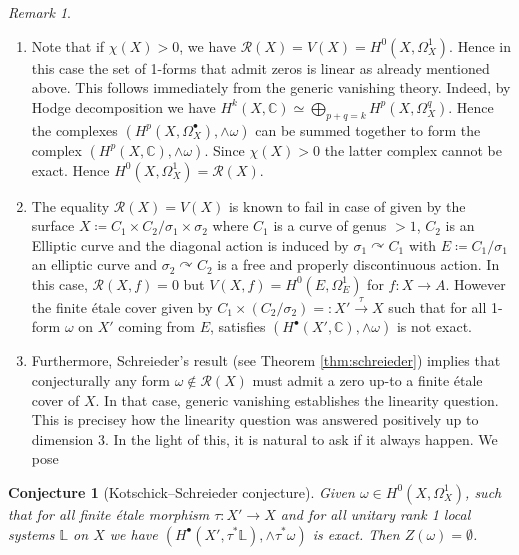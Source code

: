 \documentclass[12pt,reqno]{amsart}
\newtheorem{conjecture}[theorem]{Conjecture}
\theoremstyle{question}
\theoremstyle{definition}
\theoremstyle{remark}
\newtheorem{remark}[theorem]{Remark}
\theoremstyle{cited}
\theoremstyle{citeddef}
\newcommand{\sR}{\mathcal{R}}
\newcommand{\bbC}{\mathbb{C}}
\newcommand{\bbL}{\mathbb{L}}
\def\acts{\curvearrowright}
\begin{document}
\begin{remark}\label{rem:linearity}
\begin{enumerate} 
\item Note that if $\chi(X)>0$, we have $\sR(X) = V(X) = H^0(X, \Omega_X^1)$. Hence in this case the set of 1-forms that admit zeros is linear as already mentioned above. 
This follows immediately from the generic vanishing theory. Indeed, by Hodge decomposition
we have
$H^k(X,\bbC) \simeq \bigoplus_{p+q = k} H^p(X,\Omega_X^q)$. Hence the complexes $(H^p(X, \Omega_X^{\bullet}), \wedge\omega)$ can be summed together to form the complex $(H^p(X, \bbC), \wedge\omega)$. Since $\chi(X)>0$ the latter complex cannot be exact. Hence $H^0(X,\Omega_X^1)
= \sR(X)$.
\item \label{exa:djl} The equality $\sR(X) = V(X)$ is known to fail
in case of \cite[Example 1.11]{DJL17} given by the surface $X \coloneqq C_1\times C_2/\sigma_1\times \sigma_2$ where $C_1$ is a curve of genus $>1$, $C_2$ is an Elliptic curve and the diagonal action is induced by $\sigma_1 \acts C_1$ with $E \coloneqq C_1/\sigma_1$ an elliptic curve and $\sigma_2\acts C_2$ is a free and properly discontinuous action. In this case, $\sR(X, f) = 0$
but $V(X, f) = H^0(E, \Omega_E^1)$ for $f\colon X\to A$. 
However the
finite \'etale cover given by $C_1\times (C_2/\sigma_2)=:X'\xrightarrow{\tau} X$ such that for all 1-form $\omega$ on $X'$ coming from $E$,
satisfies $(H^{\bullet}(X', \bbC), \wedge\omega)$ is not exact. 
\item Furthermore, Schreieder's result (see Theorem \ref{thm:schreieder}) implies that conjecturally any form $\omega\notin \sR(X)$
must admit a zero up-to a finite \'etale cover of $X$. In that case, generic vanishing establishes the linearity question.
This is precisey how the linearity question was answered positively up to dimension 3. In the light of this, it is natural to ask if it always happen. We pose 
\end{enumerate}
\end{remark}
\begin{conjecture}[Kotschick--Schreieder conjecture]
Given $\omega \in H^0(X,\Omega_X^1)$, such that for all finite \'etale morphism $\tau\colon  X' \to X$
and for all unitary rank 1 local systems $\bbL$ on $X$
we have $(H^{\bullet}(X', \tau^*\bbL), \wedge\tau^*\omega)$ is exact. Then $Z(\omega) = \emptyset$. 
\end{conjecture}
\end{document}
